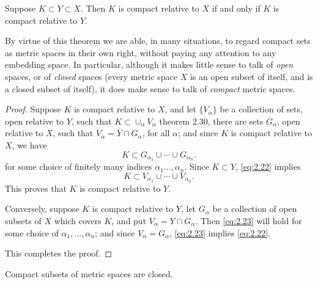 \begin{thm}
    \label{thm:2.33}
    Suppose $K \subset Y \subset X$. Then $K$ is compact relative to $X$ if and only if $K$ is compact relative to $Y$.
\end{thm}

By virtue of this theorem we are able, in many situations, 
to regard compact sets as metric spaces in their own right, 
without paying any attention to any embedding space. 
In particular, although it makes little sense to talk of \emph{open} spaces, 
or of \emph{closed} spaces 
(every metric space $X$ is an open subset of itself,
and is a closed subset of itself), 
it does make sense to talk of \emph{compact} metric spaces.

\begin{proof}
    Suppose $K$ is compact relative to $X$, and let $\{V_\alpha\}$ be a collection of sets, open relative to $Y$, such that $K \subset \cup_\alpha V_\alpha$ theorem 2.30, there are sets $G_\alpha$, open relative to $X$, such that $V_\alpha = Y \cap G_\alpha$, for all $\alpha$; and since $K$ is compact relative to $X$, we have
    \begin{equation}\label{eq:2.22}
        K \subset G_{\alpha_{1}} \cup \cdots \cup G_{\alpha_{n}}.
    \end{equation}
    for some choice of finitely many indices $\alpha_1 ..., \alpha_n$. Since $K \subset Y$, \ref{eq:2.22} implies
    \begin{equation}\label{eq:2.23}
        K \subset V_{\alpha_{1}} \cup \cdots \cup V_{\alpha_{n}}.
    \end{equation}
    This proves that $K$ is compact relative to $Y$.
    
    Conversely, suppose $K$ is compact relative to $Y$, let $G_\alpha$ be a collection of open subsets of $X$ which covers $K$, and put $V_\alpha = Y \cap G_\alpha$. Then \ref{eq:2.23} will hold for some choice of $\alpha_1, ...,\alpha_n$; and since $V_\alpha = G_\alpha$, \ref{eq:2.23} implies \ref{eq:2.22}.
    
    This completes the proof.
\end{proof}

\begin{thm}
    \label{thm:2.34}
    Compact subsets of metric spaces are closed.
\end{thm}

